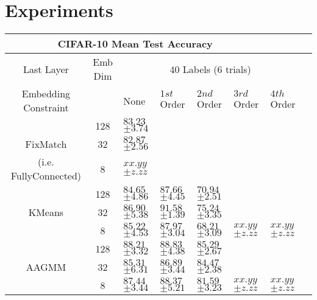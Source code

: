\documentclass[10pt,twocolumn,letterpaper]{article}
\begin{document}
\section{Experiments}


\begin{table*}[ht!]
	\begin{tabularx}{\textwidth}{c|c|XXXXXX}
		\multicolumn{6}{c}{CIFAR-10 Mean Test Accuracy} \\ \hline\hline
		Last Layer &   Emb Dim   & \multicolumn{5}{c}{40 Labels (6 trials)}            \\ 
		\hline
		Embedding Constraint  &  & None & $1st$ Order & $2nd$ Order & $3rd$ Order & $4th$ Order  \\ 
		\hline
		& 128  & $83.23$ \scriptsize{$\pm 3.74$}   &  &  &  &   \\
		FixMatch\cite{sohn2020fixmatch} & 32  & $82.87$ \scriptsize{$\pm 2.56$}    &  &  &  &   \\
		(i.e. FullyConnected) & 8  & $xx.yy$ \scriptsize{$\pm z.zz$}      &  &  &  &   \\
		\hline
		& 128  & $84.65$ \scriptsize{$\pm 4.86$}    & $87.66$ \scriptsize{$\pm 4.45$} & $70.94$ \scriptsize{$\pm 2.51$} &  &  \\
		KMeans & 32  & $86.90$ \scriptsize{$\pm 5.38$}    & $\boldsymbol{91.58}$ \scriptsize{$\pm 1.39$} & $75.24$ \scriptsize{$\pm 3.35$} &  &  \\
		& 8  & $85.22$ \scriptsize{$\pm 4.53$}    & $87.97$ \scriptsize{$\pm 3.04$} & $68.21$ \scriptsize{$\pm 3.09$} & $xx.yy$ \scriptsize{$\pm z.zz$} & $xx.yy$ \scriptsize{$\pm z.zz$}  \\
		\hline
		& 128  & $88.21$ \scriptsize{$\pm 3.32$}    & $88.83$ \scriptsize{$\pm 4.38$} & $85.29$ \scriptsize{$\pm 2.67$} &  &  \\
		AAGMM  & 32  & $85.31$ \scriptsize{$\pm 6.31$}    & $86.89$ \scriptsize{$\pm 3.44$} & $84.47$ \scriptsize{$\pm 2.38$} &  &  \\
		& 8  & $87.44$ \scriptsize{$\pm 3.44$}    & $88.37$ \scriptsize{$\pm 5.21$} & $81.59$ \scriptsize{$\pm 3.23$} & $xx.yy$ \scriptsize{$\pm z.zz$} & $xx.yy$ \scriptsize{$\pm z.zz$} \\
		

\end{tabularx}
\end{table*}
\end{document}

